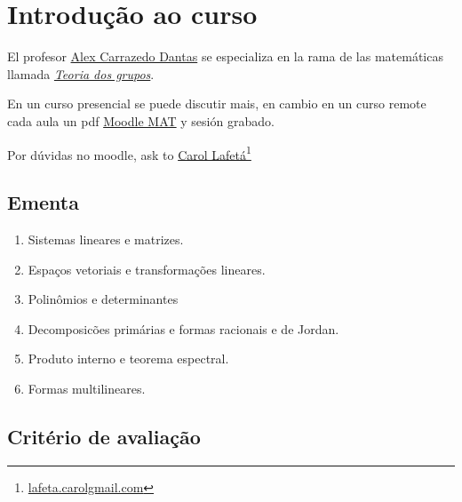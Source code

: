 \chapter*{Introdução ao curso}


El profesor \href{http://buscatextual.cnpq.br/buscatextual/visualizacv.do?id=K4463841D3}{Alex Carrazedo Dantas} se especializa en la rama de las matemáticas
llamada \href{https://pt.wikipedia.org/wiki/Teoria_dos_grupos}{
  \emph{Teoria dos grupos}}.

En un curso presencial se puede discutir mais, en cambio en un curso remote cada aula un pdf \href{https://moodle.mat.unb.br/20201}{
  Moodle MAT} y sesión grabado.

Por dúvidas no moodle, ask to
\href{http://buscatextual.cnpq.br/buscatextual/visualizacv.do?id=K8136975Z1}{Carol Lafetá}\footnote{\href{mailto:lafeta.carol@gmail.com}{lafeta.carol\MVAt gmail.com}}
\section*{Ementa}

\begin{enumerate}
  \item

        Sistemas lineares e matrizes.

  \item

        Espaços vetoriais e transformações lineares.

  \item

        Polinômios e determinantes

  \item

        Decomposicões primárias e formas racionais e de Jordan.

  \item

        Produto interno e teorema espectral.

  \item

        Formas multilineares.
\end{enumerate}

\section*{Critério de avaliação}

